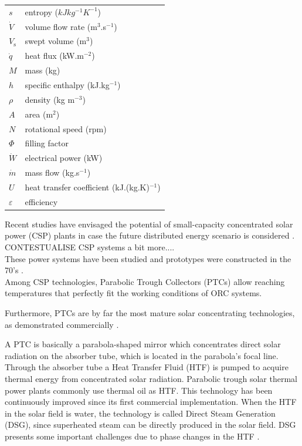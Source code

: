 \documentclass[final,3p,times,review]{elsarticle}
\begin{document}
\begin{table}[h!]
\begin{tabular}{lp{7.5cm}}
$s$ & entropy ($kJ kg^{-1} K^{-1}$)\\
$\dot{V}$ & volume flow rate (m$^3$.s$^{-1}$)\\
$V_\mathrm{s}$ & swept volume (m$^3$)\\
$\dot{q}$& heat flux (kW.m$^{-2}$) \\
$M$ & mass (kg)\\
$h$ & specific enthalpy (kJ.kg$^{-1}$)\\
$\rho$ & density (kg m$^{-3}$)\\
$A$ & area (m$^{2}$)\\
$N$ & rotational speed (rpm)\\
$\Phi$ & filling factor \\
$\dot{W}$ & electrical power (kW) \\
$\dot{m}$& mass flow (kg.s$^{-1}$) \\
$ U $& heat transfer coefficient (kJ.(kg.K)$^{-1}$) \\
$\varepsilon$ & efficiency \\
\end{tabular}
\end{table}
%
Recent studies have envisaged the potential of small-capacity concentrated solar power (CSP) plants in case the future distributed energy scenario is considered \cite{Casati2012a,Prabhu2006}. CONTESTUALISE CSP systems a bit more....\\

These power systems have been studied and prototypes were constructed in the 70’s \cite{Verneau1978,Angelino1984Areview}. \\


Among CSP technologies, Parabolic Trough Collectors (PTCs) allow reaching temperatures that perfectly fit the working conditions of ORC systems.

 Furthermore, PTCs are by far the most mature solar concentrating technologies, as demonstrated commercially \cite{Fernandez_Garcia2010}. 
 
 A PTC is basically a parabola-shaped mirror which concentrates direct solar radiation on the absorber tube, which is located in the parabola's focal line. Through the absorber tube a Heat Transfer Fluid (HTF) is pumped to acquire thermal energy from concentrated solar radiation. Parabolic trough solar thermal power plants commonly use thermal oil as HTF. This technology has been continuously improved since its first commercial implementation. When the HTF in the solar field is water, the technology is called Direct Steam Generation (DSG), since superheated steam can be directly produced in the solar field. DSG presents some important challenges due to phase changes in the HTF \cite{Bonilla_MB_2015}.
\end{document}

